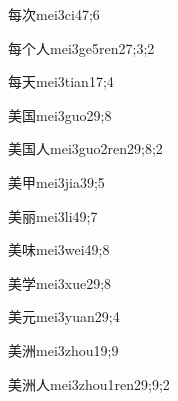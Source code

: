 \begin{verbete}{每次}{mei3ci4}{7;6}
\end{verbete}

\begin{verbete}{每个人}{mei3ge5ren2}{7;3;2}
\end{verbete}

\begin{verbete}{每天}{mei3tian1}{7;4}
\end{verbete}

\begin{verbete}{美国}{mei3guo2}{9;8}
\end{verbete}

\begin{verbete}{美国人}{mei3guo2ren2}{9;8;2}
\end{verbete}

\begin{verbete}{美甲}{mei3jia3}{9;5}
\end{verbete}

\begin{verbete}{美丽}{mei3li4}{9;7}
\end{verbete}

\begin{verbete}{美味}{mei3wei4}{9;8}
\end{verbete}

\begin{verbete}{美学}{mei3xue2}{9;8}
\end{verbete}

\begin{verbete}{美元}{mei3yuan2}{9;4}
\end{verbete}

\begin{verbete}{美洲}{mei3zhou1}{9;9}
\end{verbete}

\begin{verbete}{美洲人}{mei3zhou1ren2}{9;9;2}
\end{verbete}

